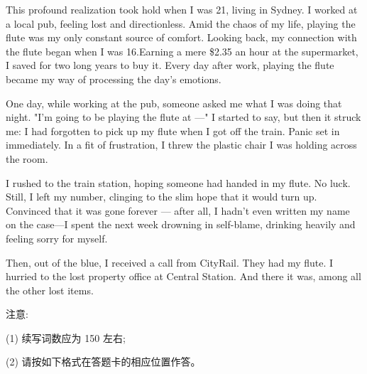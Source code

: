 \documentclass{英语试卷}
\begin{document}
\par This profound realization took hold when I was 21, living in Sydney. I worked at a local pub, feeling lost and directionless. Amid the chaos of my life, playing the flute was my only constant source of comfort. Looking back, my connection with the flute began when I was 16.Earning a mere \$2.35 an hour at the supermarket, I saved for two long years to buy it. Every day after work, playing the flute became my way of processing the day's emotions.\par
\par One day, while working at the pub, someone asked me what I was doing that night. "I'm going to be playing the flute at —" I started to say, but then it struck me: I had forgotten to pick up my flute when I got off the train. Panic set in immediately. In a fit of frustration, I threw the plastic chair I was holding across the room.\par
\par I rushed to the train station, hoping someone had handed in my flute. No luck. Still, I left my number, clinging to the slim hope that it would turn up. Convinced that it was gone forever — after all, I hadn't even written my name on the case—I spent the next week drowning in self-blame, drinking heavily and feeling sorry for myself.\par
\par Then, out of the blue, I received a call from CityRail. They had my flute. I hurried to the lost property office at Central Station. And there it was, among all the other lost items.\par
\par 注意:\par
\par (1) 续写词数应为 150 左右;\par
\par (2) 请按如下格式在答题卡的相应位置作答。\par
{}
\end{document}

